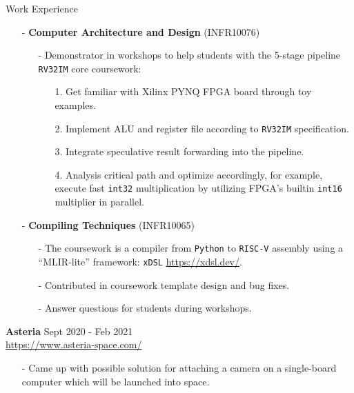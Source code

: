 \documentclass{resume} %
\newcommand{\itemsepval}{-6pt}
\newcommand{\code}{\texttt}
\begin{document}
\begin{rSection}{Work Experience}
    \begin{itemize}
        \itemsep \itemsepval {} 
        \item[-] \textbf{Computer Architecture and Design} (INFR10076)
        \begin{itemize}
            \itemsep \itemsepval {} 
            \item[-] Demonstrator in workshops to help students with the 5-stage pipeline \code{RV32IM} core coursework: 
            \begin{itemize}
                \itemsep \itemsepval {} 
                \item[1.] Get familiar with Xilinx PYNQ FPGA board through toy examples. 
                \item[2.] Implement ALU and register file according to \code{RV32IM} specification. 
                \item[3.] Integrate speculative result forwarding into the pipeline.
                \item[4.] Analysis critical path and optimize accordingly, for example, execute fast \code{int32} multiplication by utilizing FPGA's builtin \code{int16} multiplier in parallel.        
            \end{itemize}
    
        \end{itemize}

        \item[-] \textbf{Compiling Techniques} (INFR10065)
        \begin{itemize}
            \itemsep \itemsepval {} 
            \item[-] The coursework is a compiler from \code{Python} to \code{RISC-V} assembly using a ``MLIR-lite'' framework: \code{xDSL} \url{https://xdsl.dev/}.
            \item[-] Contributed in coursework template design and bug fixes. 
            \item[-] Answer questions for students during workshops.
        \end{itemize}
    \end{itemize}


    \textbf{Asteria} \hfill Sept 2020 - Feb 2021\\
    \url{https://www.asteria-space.com/} \hfill \par
    \begin{itemize}
        \itemsep \itemsepval {} 
        \item[-] Came up with possible solution for attaching a camera on a single-board computer which will be launched into space.
    \end{itemize}

\end{rSection} 
\end{document}
